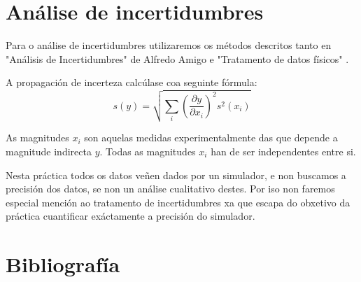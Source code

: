 \documentclass[12pt, a4paper, titlepage]{article}
\begin{document}
  \newpage
  \begin{appendices}
      \makeatletter

    \section{Análise de incertidumbres}
    \label{sec:incertidumbres}

    Para o análise de incertidumbres utilizaremos os métodos descritos tanto en "Análisis de Incertidumbres" de Alfredo Amigo \cite{amigo_2019} e "Tratamento de datos físicos" \cite{tratamiento}.

    A propagación de incerteza calcúlase coa seguinte fórmula:
    \begin{equation} \label{ec:propinc}
      s(y) = \sqrt{\sum_i\left ( \frac{\partial y}{\partial x_i} \right )^2 s^2(x_i)}
    \end{equation}

    As magnitudes $x_i$ son aquelas medidas experimentalmente das que depende a magnitude indirecta $y$. Todas as magnitudes $x_i$ han de ser independentes entre si.

    Nesta práctica todos os datos veñen dados por un simulador, e non buscamos a precisión dos datos, se non un análise cualitativo destes. Por iso non faremos especial mención ao tratamento de incertidumbres xa que escapa do obxetivo da práctica cuantificar exáctamente a precisión do simulador.

    \section{Bibliografía}


  \end{appendices}

  
\end{document}
